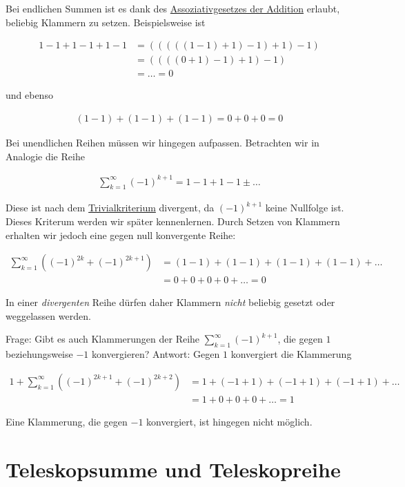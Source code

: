 \documentclass[fontsize=9pt,
               parskip=half-,
               DIV=14,
               listof=chapterentry,
               tocflat]{scrbook}
\begin{document}
Bei endlichen Summen ist es dank des \href{https://de.wikibooks.org/wiki/Mathe\_für\_Nicht-Freaks:\_Körperaxiome}
{Assoziativgesetzes der Addition} erlaubt, beliebig Klammern zu setzen. Beispielsweise ist

\begin{align*}
1-1+1-1+1-1&=(((((1-1)+1)-1)+1)-1)\\[0.3em]&=((((0+1)-1)+1)-1)\\[0.3em]&=\ldots =0
\end{align*}

und ebenso

\begin{align*}
(1-1)+(1-1)+(1-1)=0+0+0=0
\end{align*}

Bei unendlichen Reihen müssen wir hingegen aufpassen. Betrachten wir in Analogie die Reihe

\begin{align*}
\sum _{k=1}^{\infty }(-1)^{k+1}=1-1+1-1\pm \ldots 
\end{align*}

Diese ist nach dem \href{https://de.wikibooks.org/wiki/Mathe\_für\_Nicht-Freaks:\_Trivialkriterium,\_Nullfolgenkriterium,\_Divergenzkriterium}
{Trivialkriterium} divergent, da $(-1)^{k+1}$ keine Nullfolge ist. Dieses Kriterum werden wir später kennenlernen. Durch Setzen von Klammern erhalten wir jedoch eine gegen null konvergente Reihe:

\begin{align*}
\sum _{k=1}^{\infty }\left((-1)^{2k}+(-1)^{2k+1}\right)&=(1-1)+(1-1)+(1-1)+(1-1)+\ldots \\[0.3em]&=0+0+0+0+\ldots =0
\end{align*}

In einer \emph{divergenten} Reihe dürfen daher Klammern \emph{nicht} beliebig gesetzt oder weggelassen werden.

Frage: Gibt es auch Klammerungen der Reihe $\sum _{k=1}^{\infty }(-1)^{k+1}$, die gegen $1$ beziehungsweise $-1$ konvergieren? Antwort: Gegen $1$ konvergiert die Klammerung

\begin{align*}
1+\sum _{k=1}^{\infty }\left((-1)^{2k+1}+(-1)^{2k+2}\right)&=1+(-1+1)+(-1+1)+(-1+1)+\ldots \\[0.3em]&=1+0+0+0+\ldots =1
\end{align*}

Eine Klammerung, die gegen $-1$ konvergiert, ist hingegen nicht möglich.

\chapter{Teleskopsumme und Teleskopreihe}
\end{document}
